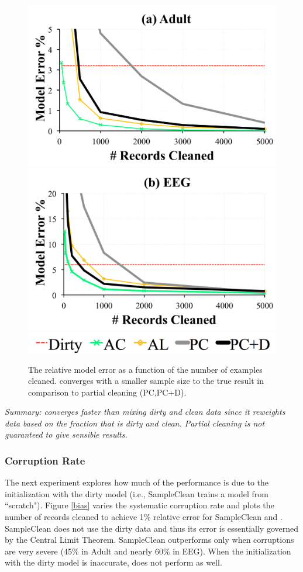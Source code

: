 \begin{figure}[ht!]
\centering
 \includegraphics[width=0.49\columnwidth]{exp/exp14a.pdf}
    \includegraphics[width=0.49\columnwidth]{exp/exp14b.pdf}
    \includegraphics[width=0.49\columnwidth]{exp/legend-14.png}\vspace{-0.5em}
 \caption{The relative model error as a function of the number of examples cleaned. \sys converges with a smaller sample size to the true result in comparison to partial cleaning (PC,PC+D).  \label{pc-perf}}
\end{figure}

\noindent \emph{Summary: \sys converges faster than mixing dirty and clean data since it reweights data based on the fraction that is dirty and clean. Partial cleaning is not guaranteed to give sensible results.}

\subsubsection{Corruption Rate}
The next experiment explores how much of the performance
is due to the initialization with the dirty model (i.e., SampleClean trains a model from ``scratch").
Figure \ref{bias} varies the systematic corruption rate and plots the number of records cleaned to achieve 1\% relative error for SampleClean and \sys.
SampleClean does not use the dirty data and thus its error is essentially governed by the Central Limit Theorem.
SampleClean outperforms \sys only when corruptions are very severe (45\% in Adult and nearly 60\% in EEG).
When the initialization with the dirty model is inaccurate, \sys does not perform as well. 

